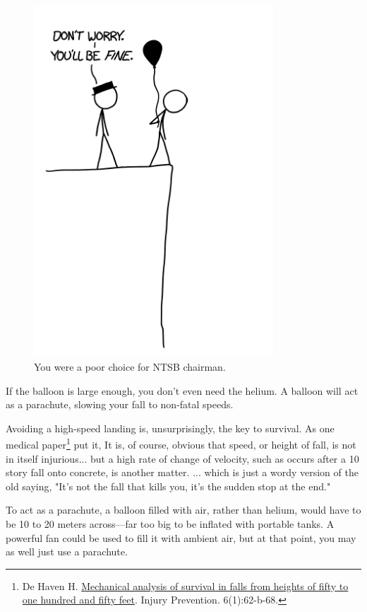 {\begin{figure}[!htbp]
\centering
\includegraphics[scale=0.5, max width=0.8\textwidth]{imgs/a/62/balloon_party.png}
\caption{You were a poor choice for NTSB chairman.}
\end{figure}

{If the balloon is large enough, you don't even need the helium. A balloon will act as a parachute, slowing your fall to non-fatal speeds.}

{Avoiding a high-speed landing is, unsurprisingly, the key to survival. As one medical paper{\footnote{De Haven H. \href{http://injuryprevention.bmj.com/content/6/1/62.3.long}{Mechanical analysis of survival in falls from heights of fifty to one hundred and fifty feet}. Injury Prevention. 6(1):62-b-68.} } put it,}
It is, of course, obvious that speed, or height of fall, is not in itself injurious... but a high rate of change of velocity, such as occurs after a 10 story fall onto concrete, is another matter.
{... which is just a wordy version of the old saying, "It's not the fall that kills you, it's the sudden stop at the end."}

{To act as a parachute, a balloon filled with air, rather than helium, would have to be 10 to 20 meters across—far too big to be inflated with portable tanks. A powerful fan could be used to fill it with ambient air, but at that point, you may as well just use a parachute.}

}
